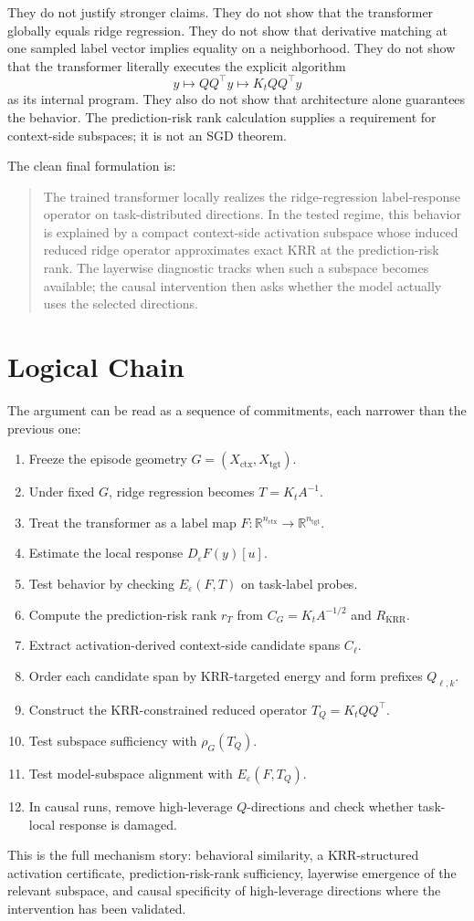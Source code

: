 \documentclass[11pt]{article}
\newcommand{\R}{\mathbb{R}}
\begin{document}
They do not justify stronger claims. They do not show that the transformer globally equals ridge
regression. They do not show that derivative matching at one sampled label vector implies equality
on a neighborhood. They do not show that the transformer literally executes the explicit algorithm
\[
y\mapsto QQ^\top y\mapsto K_tQQ^\top y
\]
as its internal program. They also do not show that architecture alone guarantees the behavior.
The prediction-risk rank calculation supplies a requirement for context-side subspaces; it is not
an SGD theorem.

The clean final formulation is:

\begin{quote}
The trained transformer locally realizes the ridge-regression label-response operator on
task-distributed directions. In the tested regime, this behavior is explained by a compact
context-side activation subspace whose induced reduced ridge operator approximates exact KRR at the
prediction-risk rank. The layerwise diagnostic tracks when such a subspace becomes available; the
causal intervention then asks whether the model actually uses the selected directions.
\end{quote}

\section{Logical Chain}

The argument can be read as a sequence of commitments, each narrower than the previous one:

\begin{enumerate}[label=\arabic*.]
\item Freeze the episode geometry \(G=(X_{\mathrm{ctx}},X_{\mathrm{tgt}})\).
\item Under fixed \(G\), ridge regression becomes \(T=K_tA^{-1}\).
\item Treat the transformer as a label map \(F:\R^{n_{\mathrm{ctx}}}\to\R^{n_{\mathrm{tgt}}}\).
\item Estimate the local response \(D_\varepsilon F(y)[u]\).
\item Test behavior by checking \(E_\varepsilon(F,T)\) on task-label probes.
\item Compute the prediction-risk rank \(r_T\) from \(C_G=K_tA^{-1/2}\) and \(R_{\mathrm{KRR}}\).
\item Extract activation-derived context-side candidate spans \(C_\ell\).
\item Order each candidate span by KRR-targeted energy and form prefixes \(Q_{\ell,k}\).
\item Construct the KRR-constrained reduced operator \(T_Q=K_tQQ^\top\).
\item Test subspace sufficiency with \(\rho_G(T_Q)\).
\item Test model-subspace alignment with \(E_\varepsilon(F,T_Q)\).
\item In causal runs, remove high-leverage \(Q\)-directions and check whether task-local response is damaged.
\end{enumerate}

This is the full mechanism story: behavioral similarity, a KRR-structured activation certificate,
prediction-risk-rank sufficiency, layerwise emergence of the relevant subspace, and causal
specificity of high-leverage directions where the intervention has been validated.
\end{document}

